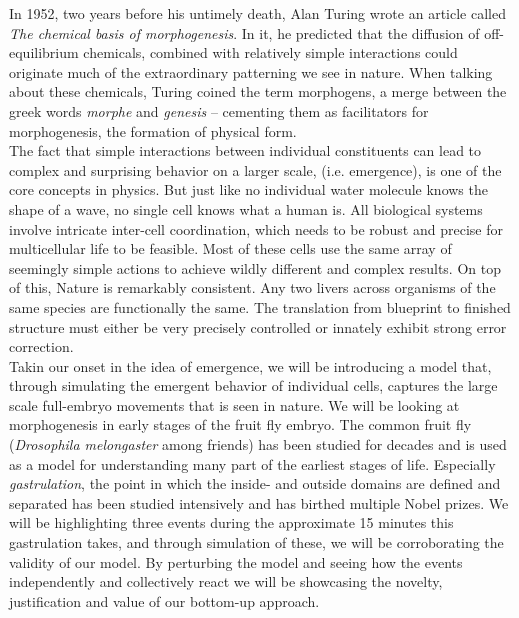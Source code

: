 
In 1952, two years before his untimely death, Alan Turing wrote an article called \textit{The chemical basis of morphogenesis}.\cite{turing52the} In it, he predicted that the diffusion of off-equilibrium chemicals, combined with relatively simple interactions could originate much of the extraordinary patterning we see in nature. When talking about these chemicals, Turing coined the term morphogens, a merge between the greek words \textit{morphe} and \textit{genesis} -- cementing them as facilitators for morphogenesis, the formation of physical form.  \\


The fact that simple interactions between individual constituents can lead to complex and surprising behavior on a larger scale, (i.e. emergence), is one of the core concepts in physics. But just like no individual water molecule knows the shape of a wave, no single cell knows what a human is. All biological systems involve intricate inter-cell coordination, which needs to be robust and precise for multicellular life to be feasible. Most of these cells use the same array of seemingly simple actions to achieve wildly different and complex results. On top of this, Nature is remarkably consistent. Any two livers across organisms of the same species are functionally the same. The translation from blueprint to finished structure must either be very precisely controlled or innately exhibit strong error correction. \\

Takin our onset in the idea of emergence, we will be introducing a model that, through simulating the emergent behavior of individual cells, captures the large scale  full-embryo movements that is seen in nature. We will be looking at morphogenesis in early stages of the fruit fly embryo. The common fruit fly (\textit{Drosophila melongaster} among friends) has been studied for decades and is used as a model for understanding many part of the earliest stages of life. Especially \textit{gastrulation}, the point in which the inside- and outside domains are defined and separated has been studied intensively and has birthed multiple Nobel prizes. We will be highlighting three events during the approximate 15 minutes this gastrulation takes, and through simulation of these, we will be corroborating the validity of our model. By perturbing the model and seeing how the events independently and collectively react we will be showcasing the novelty, justification and value of our bottom-up approach.\\

